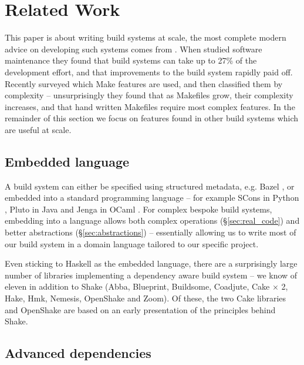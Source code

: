\vspace{-1mm}
\section{Related Work\label{section-review}}
\vspace{-1mm}

This paper is about writing build systems at scale, the most complete modern advice on developing such systems comes from \citet{smith:software_build_systems}. When
\citet{mcintosh:build_maintenance_effort} studied software maintenance they
found that build systems can take up to 27\% of the
development effort, and that improvements to the build system rapidly paid off.
Recently \citet{martin:make_it_simple} surveyed which Make features are used,
and then \citet{martin:maintenance_complexity_makefiles} classified them by
complexity -- unsurprisingly they found that as Makefiles grow, their complexity
increases, and that hand written Makefiles require most complex features. In
the remainder of this section we focus on features found in other
build systems which are useful at scale.

\vspace{-0.5mm}
\subsection{Embedded language}
\vspace{-0.5mm}

A build system can either be specified using structured metadata, e.g. Bazel
\cite{bazel}, or embedded into a standard programming language -- for example
SCons in Python \cite{scons}, Pluto in Java \cite{pluto} and Jenga in OCaml
\cite{jenga}. For complex bespoke build systems, embedding into a language
allows both complex operations (\S\ref{sec:real_code}) and better abstractions
(\S\ref{sec:abstractions}) -- essentially allowing us to write most of our build
system in a domain language tailored to our specific project.

Even sticking to Haskell as the embedded language, there are a surprisingly
large number of libraries implementing a dependency aware build system -- we
know of eleven in addition to Shake (Abba, Blueprint, Buildsome, Coadjute, Cake
$\times$ 2, Hake, Hmk, Nemesis, OpenShake and Zoom). Of these, the two Cake
libraries and OpenShake are based on an early presentation of the principles behind Shake.

\vspace{-0.5mm}
\subsection{Advanced dependencies}
\vspace{-0.5mm}

